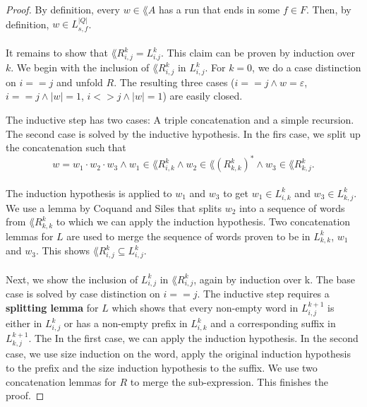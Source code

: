 \begin{proof}
    By definition, every $w \in \lang{A}$ has a run that ends in some $f \in F$. 
    Then, by definition, $w \in  L^{|Q|}_{s, f}$. 

    \paragraph{}
    It remains to show that $\lang{R^k_{i,j}} = L^k_{i.j}$. 
    This claim can be proven by induction over $k$. 
    We begin with the inclusion of $\lang{R^k_{i,j}}$ in $L^k_{i,j}$. 
    For $k=0$, we do a case distinction on $i==j$ and unfold $R$. 
    The resulting three cases ($i==j \wedge w=\varepsilon$, $i==j \wedge |w|=1$, $i<>j \wedge |w|=1$) are easily closed. 

    The inductive step has two cases: A triple concatenation and a simple recursion. 
    The second case is solved by the inductive hypothesis.
    In the firs case, we split up the concatenation such that
    \begin{equation*}
        w = w_1 \cdot w_2 \cdot w_3 
        \wedge w_1 \in \lang{R^k_{i,k}} 
        \wedge w_2 \in \lang{(R^k_{k,k})^*} 
        \wedge w_3 \in \lang{R^k_{k,j}}.                               
    \end{equation*}
    \paragraph{}
    The induction hypothesis is applied to $w_1$ and $w_3$ to get $w_1 \in L^k_{i,k}$ and $w_3 \in L^k_{k,j}$.
    We use a lemma by Coquand and Siles that splits $w_2$ into a sequence of words from $\lang{R^k_{k,k}}$ to which we can apply the induction hypothesis. 
    Two concatenation lemmas for $L$ are used to merge the sequence of words proven to be in $L^k_{k,k}$,
    $w_1$ and $w_3$. This shows $\lang{R^k_{i,j}} \subseteq L^k_{i,j}$.

    \paragraph{}
    Next, we show the inclusion of $L^k_{i,j}$ in $\lang{R^k_{i,j}}$, again by induction over k. 
    The base case is solved by case distinction on $i==j$. 
    The inductive step requires a \textbf{splitting lemma} for $L$ which shows that every non-empty word in $L^{k+1}_{i,j}$ is either in $L^k_{i,j}$ or has a non-empty prefix in $L^k_{i,k}$ and a corresponding suffix in $L^{k+1}_{k,j}$.
    The 
    In the first case, we can apply the induction hypothesis. 
    In the second case, we use size induction on the word, apply the original induction hypothesis to the prefix and the size induction hypothesis to the suffix. 
    We use two concatenation lemmas for $R$ to merge the sub-expression. 
    This finishes the proof.
\end{proof}


